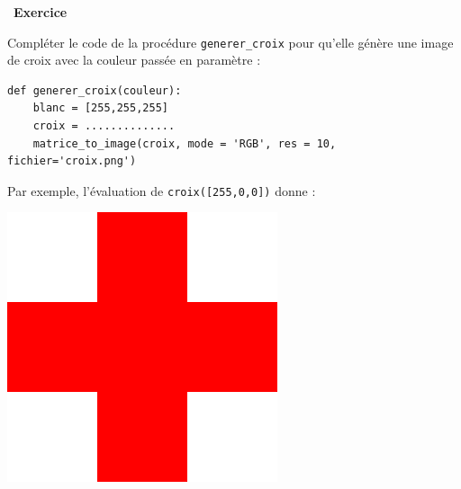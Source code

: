\documentclass[a4paper, french, 12pt]{article}
\newcounter{exo}
\newenvironment{exercice}[1]
{\par \medskip   \addtocounter{exo}{1} \noindent  
\begin{bclogo}[arrondi =0.1,   noborder = true, logo=\bccrayon, marge=4]{~\textbf{Exercice} \textbf{\theexo} {\itshape #1} }  \par}
{
\end{bclogo}
 \par \bigskip }
\newcounter{def}
\begin{document}
\begin{exercice}{}

Compléter le code de la procédure \texttt{generer\_croix} pour qu'elle génère une image de croix avec la couleur passée en paramètre :

\begin{lstlisting}[style=rond]
def generer_croix(couleur):
    blanc = [255,255,255]
    croix = ..............
    matrice_to_image(croix, mode = 'RGB', res = 10, fichier='croix.png')  
\end{lstlisting}

Par exemple, l'évaluation de \texttt{croix([255,0,0])} donne :
\begin{center}
\includegraphics[scale=0.2]{images/croix.png}
\end{center}

\end{exercice}

\vspace*{-20pt}
\end{document}
